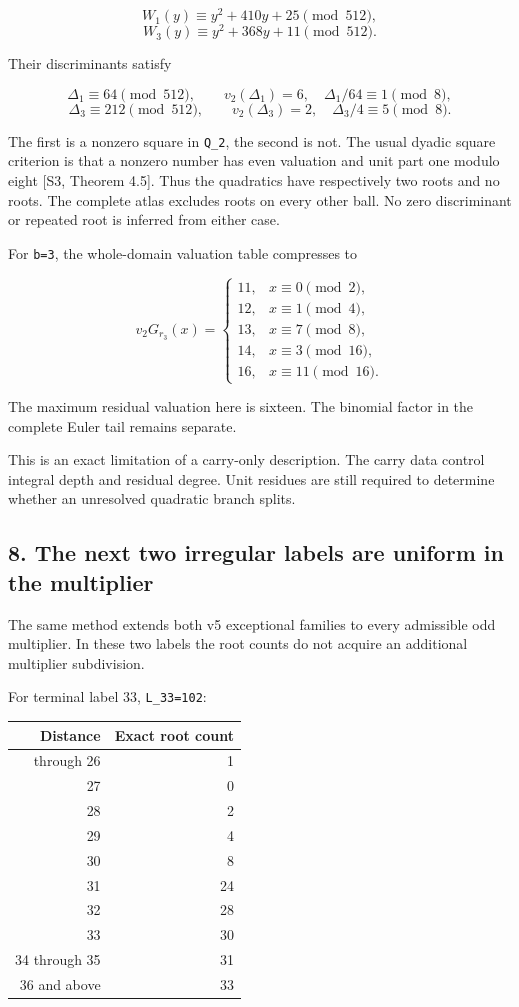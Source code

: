 \documentclass[11pt,letterpaper]{article}
\begin{document}
\[
W_1(y)\equiv y^2+410y+25\pmod{512},
\] \[
W_3(y)\equiv y^2+368y+11\pmod{512}.
\]


Their discriminants satisfy

\[
\Delta_1\equiv64\pmod{512},\qquad
v_2(\Delta_1)=6,\quad \Delta_1/64\equiv1\pmod8,
\] \[
\Delta_3\equiv212\pmod{512},\qquad
v_2(\Delta_3)=2,\quad \Delta_3/4\equiv5\pmod8.
\]

The first is a nonzero square in \texttt{Q\_2}, the second is not. The usual dyadic square criterion is that a nonzero number has even valuation and unit part one modulo eight {[}S3, Theorem 4.5{]}. Thus the quadratics have respectively two roots and no roots. The complete atlas excludes roots on every other ball. No zero discriminant or repeated root is inferred from either case.

For \texttt{b=3}, the whole-domain valuation table compresses to

\[
v_2G_{r_3}(x)=
\begin{cases}
11,&x\equiv0\pmod2,\\
12,&x\equiv1\pmod4,\\
13,&x\equiv7\pmod8,\\
14,&x\equiv3\pmod{16},\\
16,&x\equiv11\pmod{16}.
\end{cases} \tag{VI.16}
\]

The maximum residual valuation here is sixteen. The binomial factor in the complete Euler tail remains separate.

This is an exact limitation of a carry-only description. The carry data control integral depth and residual degree. Unit residues are still required to determine whether an unresolved quadratic branch splits.

\subsection{8. The next two irregular labels are uniform in the multiplier}\label{the-next-two-irregular-labels-are-uniform-in-the-multiplier}

The same method extends both v5 exceptional families to every admissible odd multiplier. In these two labels the root counts do not acquire an additional multiplier subdivision.

For terminal label 33, \texttt{L\_33=102}:

\begin{longtable}[]{@{}rr@{}}
\toprule\noalign{}
Distance & Exact root count \\
\midrule\noalign{}
\endhead
\bottomrule\noalign{}
\endlastfoot
0 through 26 & 1 \\
27 & 0 \\
28 & 2 \\
29 & 4 \\
30 & 8 \\
31 & 24 \\
32 & 28 \\
33 & 30 \\
34 through 35 & 31 \\
36 and above & 33 \\
\end{longtable}
\end{document}
